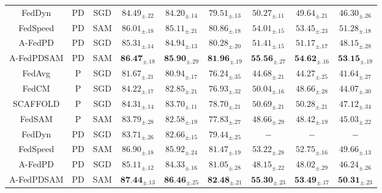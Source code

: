 \begin{table}[t]
\begin{center}
{\begin{sc}
{\begin{tabular}{@{}c|cc|cccccc@{}}
FedDyn       & PD & SGD & $\text{84.49}_{\pm.22}$ & $\text{84.20}_{\pm.14}$ & $\text{79.51}_{\pm.13}$ & $\text{50.27}_{\pm.11}$ & $\text{49.64}_{\pm.21}$ & $\text{46.30}_{\pm.26}$ \\ 
FedSpeed     & PD & SAM & $\text{86.01}_{\pm.18}$ & $\text{85.11}_{\pm.21}$ & $\text{80.86}_{\pm.18}$ & $\text{54.01}_{\pm.15}$ & $\text{53.45}_{\pm.23}$ & $\text{51.28}_{\pm.18}$ \\
\cmidrule(lr){1-1} \cmidrule(lr){2-9}
A-FedPD      & PD & SGD & $\text{85.31}_{\pm.14}$ & $\text{84.94}_{\pm.13}$ & $\text{80.28}_{\pm.20}$ & $\text{51.41}_{\pm.15}$ & $\text{51.17}_{\pm.17}$ & $\text{48.15}_{\pm.28}$ \\  
A-FedPDSAM   & PD & SAM & $\textbf{86.47}_{\pm.18}$ & $\textbf{85.90}_{\pm.29}$ & $\textbf{81.96}_{\pm.19}$ & $\textbf{55.56}_{\pm.27}$ & $\textbf{54.62}_{\pm.16}$ & $\textbf{53.15}_{\pm.19}$ \\  
\cmidrule(lr){1-1} \cmidrule(lr){2-9}
FedAvg       & P & SGD & $\text{81.67}_{\pm.21}$ & $\text{80.94}_{\pm.17}$ & $\text{76.24}_{\pm.35}$ & $\text{44.68}_{\pm.21}$ & $\text{44.27}_{\pm.25}$ & $\text{41.64}_{\pm.27}$ \\ 
FedCM        & P & SGD & $\text{84.22}_{\pm.17}$ & $\text{82.85}_{\pm.21}$ & $\text{76.93}_{\pm.32}$ & $\text{50.04}_{\pm.16}$ & $\text{48.66}_{\pm.28}$ & $\text{44.07}_{\pm.30}$ \\ 
SCAFFOLD     & P & SGD & $\text{84.31}_{\pm.14}$ & $\text{83.70}_{\pm.11}$ & $\text{78.70}_{\pm.21}$ & $\text{50.69}_{\pm.21}$ & $\text{50.28}_{\pm.21}$ & $\text{47.12}_{\pm.34}$ \\ 
FedSAM       & P & SAM & $\text{83.79}_{\pm.28}$ & $\text{82.58}_{\pm.19}$ & $\text{77.83}_{\pm.27}$ & $\text{48.66}_{\pm.29}$ & $\text{48.42}_{\pm.19}$ & $\text{45.03}_{\pm.22}$ \\  
FedDyn       & PD & SGD & $\text{83.71}_{\pm.26}$ & $\text{82.66}_{\pm.15}$ & $\text{79.44}_{\pm.25}$ & $-$ & $-$ & $-$ \\ 
FedSpeed     & PD & SAM & $\text{86.90}_{\pm.18}$ & $\text{85.92}_{\pm.24}$ & $\text{81.47}_{\pm.19}$ & $\text{53.22}_{\pm.28}$ & $\text{52.75}_{\pm.16}$ & $\text{49.66}_{\pm.13}$ \\
\cmidrule(lr){1-1} \cmidrule(lr){2-9}
A-FedPD      & PD & SGD & $\text{85.11}_{\pm.12}$ & $\text{84.33}_{\pm.16}$ & $\text{81.05}_{\pm.28}$ & $\text{48.15}_{\pm.22}$ & $\text{48.02}_{\pm.29}$ & $\text{46.24}_{\pm.26}$ \\  
A-FedPDSAM   & PD & SAM & $\textbf{87.44}_{\pm.13}$ & $\textbf{86.46}_{\pm.25}$ & $\textbf{82.48}_{\pm.21}$ & $\textbf{55.30}_{\pm.23}$ & $\textbf{53.49}_{\pm.17}$ & $\textbf{50.31}_{\pm.23}$ \\  
\bottomrule
\end{tabular}}
\label{acc}
\end{sc}
}
\end{center}
\vspace{-0.4cm}
\end{table}

